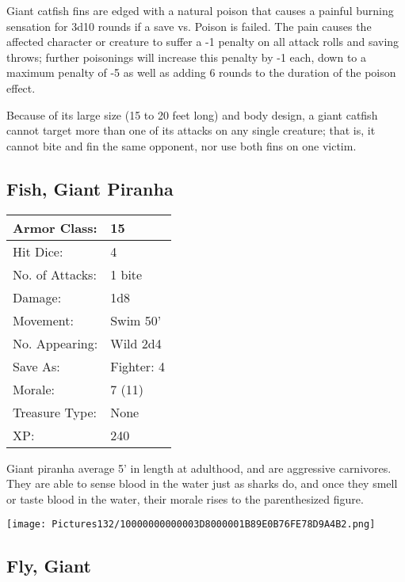 \documentclass[a4paper,twoside,openany,10pt]{book}
\begin{document}
\begin{multicols}{2}
Giant catfish fins are edged with a natural poison that causes a painful burning sensation for 3d10 rounds if a save vs. Poison is failed. The pain causes the affected character or creature to suffer a -1 penalty on all attack rolls and saving throws; further poisonings will increase this penalty by -1 each, down to a maximum penalty of -5 as well as adding 6 rounds to the duration of the poison effect.

Because of its large size (15 to 20 feet long) and body design, a giant catfish cannot target more than one of its attacks on any single creature; that is, it cannot bite and fin the same opponent, nor use both fins on one victim.

\subsection*{Fish, Giant Piranha}\label{fish-giant-piranha}

\begin{tabularx}{0.48\textwidth}{@{}lX@{}}
Armor Class: & 15 \\\hline
Hit Dice: & 4 \\\hline
No. of Attacks: & 1 bite \\\hline
Damage: & 1d8 \\\hline
Movement: & Swim 50' \\\hline
No. Appearing: & Wild 2d4 \\\hline
Save As: & Fighter: 4 \\\hline
Morale: & 7 (11) \\\hline
Treasure Type: & None \\\hline
XP: & 240 \\\hline
\end{tabularx}\medskip


Giant piranha average 5' in length at adulthood, and are aggressive carnivores. They are able to sense blood in the water just as sharks do, and once they smell or taste blood in the water, their morale rises to the parenthesized figure.

\begin{center}
	\texttt{[image: Pictures132/10000000000003D8000001B89E0B76FE78D9A4B2.png]}
\end{center}

\subsection*{Fly, Giant}\label{fly-giant}


\end{multicols}
\end{document}
